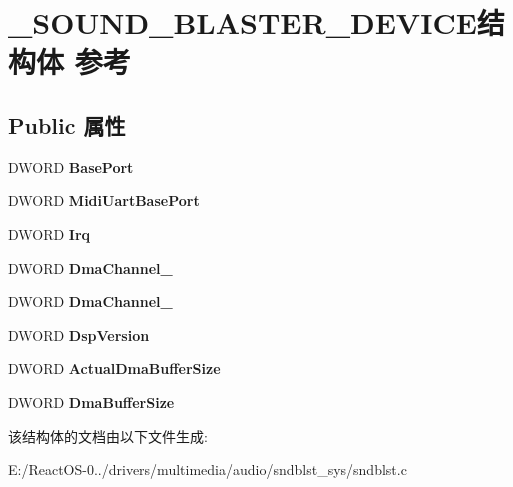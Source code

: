 \hypertarget{struct___s_o_u_n_d___b_l_a_s_t_e_r___d_e_v_i_c_e}{}\section{\+\_\+\+S\+O\+U\+N\+D\+\_\+\+B\+L\+A\+S\+T\+E\+R\+\_\+\+D\+E\+V\+I\+C\+E结构体 参考}
\label{struct___s_o_u_n_d___b_l_a_s_t_e_r___d_e_v_i_c_e}
\subsection*{Public 属性}
\begin{DoxyCompactItemize}
\item 
\mbox{\label{struct___s_o_u_n_d___b_l_a_s_t_e_r___d_e_v_i_c_e_a2cc47ea7a2a17c26148983c7411ccaf1}} 
D\+W\+O\+RD {\bfseries Base\+Port}
\item 
\mbox{\label{struct___s_o_u_n_d___b_l_a_s_t_e_r___d_e_v_i_c_e_a12f292da502f041b42651437efdfec45}} 
D\+W\+O\+RD {\bfseries Midi\+Uart\+Base\+Port}
\item 
\mbox{\label{struct___s_o_u_n_d___b_l_a_s_t_e_r___d_e_v_i_c_e_a623a1e1ff9d3799754879cd987125540}} 
D\+W\+O\+RD {\bfseries Irq}
\item 
\mbox{\label{struct___s_o_u_n_d___b_l_a_s_t_e_r___d_e_v_i_c_e_a640fdb299abbbc94572d54b0e1ce05b2}} 
D\+W\+O\+RD {\bfseries Dma\+Channel\+\_}
\item 
\mbox{\label{struct___s_o_u_n_d___b_l_a_s_t_e_r___d_e_v_i_c_e_a20859ff50069b472bdda0e75bd8f8f5d}} 
D\+W\+O\+RD {\bfseries Dma\+Channel\+\_}
\item 
\mbox{\label{struct___s_o_u_n_d___b_l_a_s_t_e_r___d_e_v_i_c_e_a4a7748b28a94601bd4364e4e89415fab}} 
D\+W\+O\+RD {\bfseries Dsp\+Version}
\item 
\mbox{\label{struct___s_o_u_n_d___b_l_a_s_t_e_r___d_e_v_i_c_e_ad66b2757e4f16636d585e26e2e2a42f7}} 
D\+W\+O\+RD {\bfseries Actual\+Dma\+Buffer\+Size}
\item 
\mbox{\label{struct___s_o_u_n_d___b_l_a_s_t_e_r___d_e_v_i_c_e_aee5ae623320d2862fced65ccaa142e63}} 
D\+W\+O\+RD {\bfseries Dma\+Buffer\+Size}
\end{DoxyCompactItemize}


该结构体的文档由以下文件生成\+:\begin{DoxyCompactItemize}
\item 
E\+:/\+React\+O\+S-\/0../drivers/multimedia/audio/sndblst\+\_\+sys/sndblst.\+c\end{DoxyCompactItemize}
